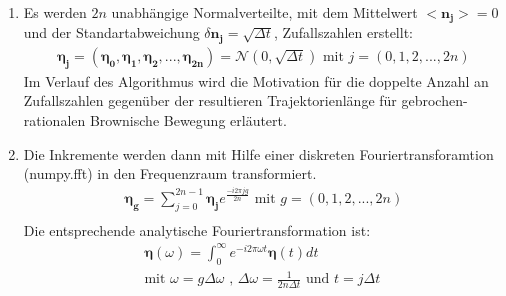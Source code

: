 \documentclass[
  a4paper,BCOR10mm,oneside,
  bibtotoc,idxtotoc,
  headsepline,footsepline,%
  fleqn,openbib
]{scrbook}
\begin{document}
\begin{enumerate}
 \item Es werden $2 n$ unabhängige Normalverteilte, mit dem Mittelwert $<\boldsymbol{n_j}>=0$ und der Standartabweichung $\delta \boldsymbol{n_j} = \sqrt{\Delta t}$, Zufallszahlen erstellt: 
 \begin{align}
  \boldsymbol{\eta_j}=(\boldsymbol{\eta_0},\boldsymbol{\eta_1},\boldsymbol{\eta_2},...,\boldsymbol{\eta_{2n}})= \boldsymbol{\mathcal{N}}(0,\sqrt{\Delta t}) \text{  mit  } j=(0,1,2,...,2n)
 \end{align}
Im Verlauf des Algorithmus wird die Motivation für die doppelte Anzahl an Zufallszahlen gegenüber der resultieren Trajektorienlänge für gebrochen-rationalen Brownische Bewegung erläutert.
 \item Die Inkremente werden dann mit Hilfe einer diskreten Fouriertransforamtion (numpy.fft) in den Frequenzraum transformiert.
 \begin{align}
  \boldsymbol{\eta_g}=\sum_{j=0}^{2n-1} \boldsymbol{\eta_j} e^{\frac{- i 2 \pi  j g }{2n}} \text{ mit } g = (0,1,2,...,2n) \\ 
  \end{align}
 Die entsprechende analytische Fouriertransformation ist:
 \begin{align}
  \boldsymbol{\eta}(\omega)=\int_0^{\infty}e^{- i 2 \pi \omega t}  \boldsymbol{\eta}(t) dt  \label{eq:diskret-freq1} \\
 \text{mit }\omega = g \Delta \omega \text{ , } \Delta \omega =  \frac{1}{2n \Delta t} \text{ und } t=j \Delta t \ \label{eq:diskret-freq}
 \end{align}
 

\end{enumerate}
\end{document}
